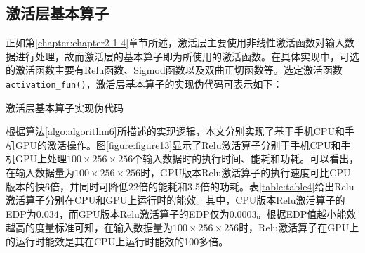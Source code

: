 \subsection{激活层基本算子}

正如第\ref{chapter:chapter2-1-4}章节所述，激活层主要使用非线性激活函数对输入数据进行处理，故而激活层的基本算子即为所使用的激活函数。在具体实现中，可选的激活函数主要有Relu函数、Sigmod函数以及双曲正切函数等。选定激活函数\texttt{activation\_fun()}，激活层基本算子的实现伪代码可表示如下：

\begin{algorithm}[htbp]
	\small
	\SetAlgoLined
	\caption{激活层基本算子实现伪代码}
	\label{algo:algorithm6}
\end{algorithm}

根据算法\ref{algo:algorithm6}所描述的实现逻辑，本文分别实现了基于手机CPU和手机GPU的激活操作。图\ref{figure:figure13}显示了Relu激活算子分别于手机CPU和手机GPU上处理$100 \times 256 \times 256 $个输入数据时的执行时间、能耗和功耗。可以看出，在输入数据量为$100 \times 256 \times 256 $时，GPU版本Relu激活算子的执行速度可比CPU版本的快6倍，并同时可降低22倍的能耗和3.5倍的功耗。表\ref{table:table4}给出Relu激活算子分别在CPU和GPU上运行时的能效。其中，CPU版本Relu激活算子的EDP为0.034，而GPU版本Relu激活算子的EDP仅为0.0003。根据EDP值越小能效越高的度量标准可知，在输入数据量为$100 \times 256 \times 256 $时，Relu激活算子在GPU上的运行时能效是其在CPU上运行时能效的100多倍。

